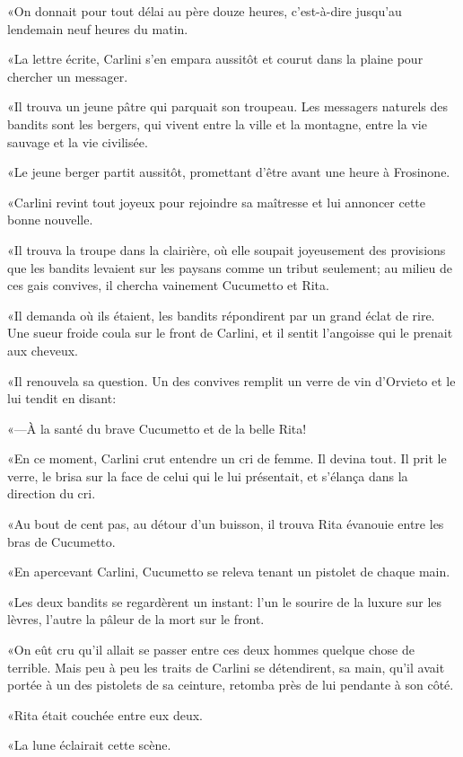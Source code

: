 «On donnait pour tout délai au père douze heures, c'est-à-dire jusqu'au lendemain neuf heures du matin. 

«La lettre écrite, Carlini s'en empara aussitôt et courut dans la plaine pour chercher un messager. 

«Il trouva un jeune pâtre qui parquait son troupeau. Les messagers naturels des bandits sont les bergers, qui vivent entre la ville et la montagne, entre la vie sauvage et la vie civilisée. 

«Le jeune berger partit aussitôt, promettant d'être avant une heure à Frosinone. 

«Carlini revint tout joyeux pour rejoindre sa maîtresse et lui annoncer cette bonne nouvelle. 

«Il trouva la troupe dans la clairière, où elle soupait joyeusement des provisions que les bandits levaient sur les paysans comme un tribut seulement; au milieu de ces gais convives, il chercha vainement Cucumetto et Rita. 

«Il demanda où ils étaient, les bandits répondirent par un grand éclat de rire. Une sueur froide coula sur le front de Carlini, et il sentit l'angoisse qui le prenait aux cheveux. 

«Il renouvela sa question. Un des convives remplit un verre de vin d'Orvieto et le lui tendit en disant:  

«—À la santé du brave Cucumetto et de la belle Rita! 

«En ce moment, Carlini crut entendre un cri de femme. Il devina tout. Il prit le verre, le brisa sur la face de celui qui le lui présentait, et s'élança dans la direction du cri. 

«Au bout de cent pas, au détour d'un buisson, il trouva Rita évanouie entre les bras de Cucumetto. 

«En apercevant Carlini, Cucumetto se releva tenant un pistolet de chaque main. 

«Les deux bandits se regardèrent un instant: l'un le sourire de la luxure sur les lèvres, l'autre la pâleur de la mort sur le front. 

«On eût cru qu'il allait se passer entre ces deux hommes quelque chose de terrible. Mais peu à peu les traits de Carlini se détendirent, sa main, qu'il avait portée à un des pistolets de sa ceinture, retomba près de lui pendante à son côté. 

«Rita était couchée entre eux deux. 

«La lune éclairait cette scène. 

